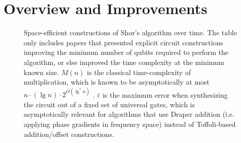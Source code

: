 \documentclass[twocolumn,longbibliography]{quantumarticle}
\begin{document}
\section{Overview and Improvements} \label{sec:costs}

\begin{figure}
  \centering
  \caption{
    Space-efficient constructions of Shor's algorithm over time.
    The table only includes papers that presented explicit circuit constructions improving the minimum number of qubits required to perform the algorithm, or else improved the time complexity at the minimum known size.
    $M(n)$ is the classical time-complexity of multiplication, which is known to be asymptotically at most $n \cdot (\lg n) \cdot 2^{O(\lg^* n)}$ \cite{furer2007}.
    $\varepsilon$ is the maximum error when synthesizing the circuit out of a fixed set of universal gates, which is asymptotically relevant for algorithms that use Draper addition \cite{draper2000} (i.e. applying phase gradients in frequency space) instead of Toffoli-based addition/offset constructions.
  }
  \label{fig:table-over-time}
\end{figure}
\end{document}
